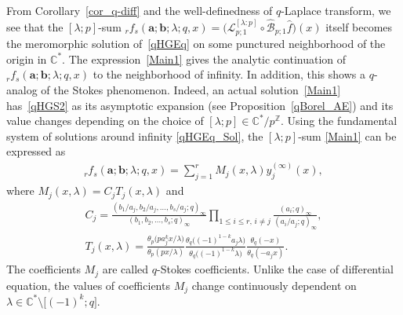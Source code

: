 \documentclass[11pt]{article}
\numberwithin{equation}{section}
\begin{document}
From Corollary~\ref{cor_q-diff} and the well-definedness of $q$-Laplace transform, we see that the $[\lambda;p]$-sum ${}_rf_s(\bm{a};\bm{b};\lambda;q,x)=\big(\mathcal{L}_{p;1}^{[\lambda:p]}\circ\mathcal{\hat{B}}_{p;1}\hat{f}\big)(x)$ itself becomes the meromorphic solution of~\eqref{qHGEq} on some punctured neighborhood of the origin in $\mathbb{C}^*$. The expression~\eqref{Main1} gives the analytic continuation of ${}_rf_s(\bm{a};\bm{b};\lambda;q,x)$ to the neighborhood of infinity.
 In addition, this shows a $q$-analog of the Stokes phenomenon. Indeed, an actual solution~\eqref{Main1} has~\eqref{qHGS2} as its asymptotic expansion (see Proposition~\ref{qBorel_AE}) and its value changes depending on the choice of $[\lambda;p]\in\mathbb{C}^*/p^{\mathbb{Z}}$.
Using the fundamental system of solutions around infinity \eqref{qHGEq_Sol}, the $[\lambda;p]$-sum \eqref{Main1} can be expressed as
\begin{gather*}
{}_rf_s(\bm{a};\bm{b};\lambda;q,x)=\sum_{j=1}^r M_j(x,\lambda)y_j^{(\infty)}(x),
\end{gather*}
where $M_j(x,\lambda)=C_jT_j(x,\lambda)$ and
\begin{gather*}
C_j=\frac{(b_1/a_j,b_2/a_j,\ldots,b_s/a_j;q)_\infty}{(b_1,b_2,\ldots,b_s;q)_\infty}\prod_{1\le i\le r,\, i\neq j}\frac{(a_i;q)_\infty}{(a_i/a_j;q)_\infty},\\
T_j(x,\lambda)=\frac{\theta_{p}\big(pa_j^kx/\lambda\big)}{\theta_{p}(px/\lambda)}\frac{\theta_q\big((-1)^{1-k}a_j\lambda\big)}{\theta_q\big((-1)^{1-k}\lambda\big)}\frac{\theta_q(-x)}{\theta_q(-a_jx)}\label{T_j}.
\end{gather*}
The coefficients $M_j$ are called $q$-Stokes coefficients. Unlike the case of differential equation, the values of coefficients $M_j$ change continuously dependent on $\lambda\in\mathbb{C}^*\setminus\big[(-1)^k;q\big]$.

\setcounter{section}{3}
\setcounter{subsection}{0}
\setcounter{subsubsection}{0}
\setcounter{Theorem}{2}
\setcounter{equation}{3}
\end{document}

